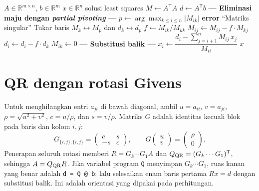 \documentclass[11pt,a4paper]{article}
\newcommand{\R}{\mathbb{R}}
\begin{document}
\begin{algorithm}[H]
\caption{Penyelesaian Persamaan Normal via Eliminasi Gauss dengan \emph{Partial Pivoting}}
\begin{algorithmic}[1]
\Require $A\in\R^{m\times n}$, $b\in\R^m$
\Ensure $x\in\R^n$ solusi least squares
\State $M \gets A^\mathsf{T}A$ 
\State $d \gets A^\mathsf{T}b$ 
\Statex \textbf{--- Eliminasi maju dengan \emph{partial pivoting} ---}
    \State $p \gets \arg\max_{k \le i \le n} |M_{ik}|$ 
        \State \textbf{error} ``Matriks singular''
    \EndIf
    \State Tukar baris $M_k \leftrightarrow M_p$ dan $d_k \leftrightarrow d_p$
        \State $f \gets M_{ik} / M_{kk}$
            \State $M_{ij} \gets M_{ij} - f \cdot M_{kj}$
        \EndFor
        \State $d_i \gets d_i - f \cdot d_k$
        \State $M_{ik} \gets 0$
    \EndFor
\EndFor
\Statex \textbf{--- Substitusi balik ---}
    \State $x_i \gets \dfrac{d_i - \sum_{j=i+1}^{n} M_{ij}\, x_j}{M_{ii}}$
\EndFor
\State \Return $x$
\end{algorithmic}
\end{algorithm}

\section{QR dengan rotasi Givens}
Untuk menghilangkan entri $a_{ji}$ di bawah diagonal, ambil $u=a_{ii}$, $v=a_{ji}$, $\rho=\sqrt{u^2+v^2}$, $c=u/\rho$, dan $s=v/\rho$. Matriks $G$ adalah identitas kecuali blok pada baris dan kolom $i,j$:
\begin{equation}
G_{\{i,j\},\{i,j\}}=\begin{pmatrix}c&s\\-s&c\end{pmatrix},\qquad
G\begin{pmatrix}u\\v\end{pmatrix}=\begin{pmatrix}\rho\\0\end{pmatrix}.
\end{equation}
Penerapan seluruh rotasi memberi $R=G_k\cdots G_1A$ dan $Q_{\rm QR}=(G_k\cdots G_1)^\mathsf{T}$, sehingga $A=Q_{\rm QR}R$. Jika variabel program \texttt{Q} menyimpan $G_k\cdots G_1$, ruas kanan yang benar adalah \texttt{d = Q @ b}; lalu selesaikan enam baris pertama $Rx=d$ dengan substitusi balik. Ini adalah orientasi yang dipakai pada perhitungan.
\end{document}
